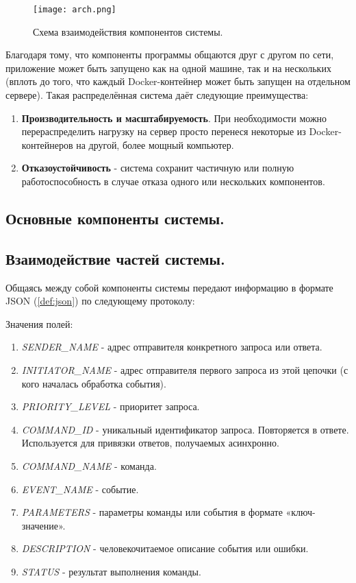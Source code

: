 \begin{figure}[h]
    \centering
    \texttt{[image: arch.png]}
    \caption{Схема взаимодействия компонентов системы.}
    \label{fig:arch}
\end{figure}

\noindent Благодаря тому, что компоненты программы общаются друг с другом по сети, приложение может быть запущено как
на одной машине, так и на нескольких (вплоть до того, что каждый Docker-контейнер может быть запущен на отдельном сервере).
Такая распределённая система даёт следующие преимущества:
\begin{enumerate}
    \item \textbf{Производительность и масштабируемость}. При необходимости можно перераспределить нагрузку на сервер
    просто перенеся некоторые из Docker-контейнеров на другой, более мощный компьютер.
    \item \textbf{Отказоустойчивость} - система сохранит частичную или полную работоспособность в случае отказа одного
    или нескольких компонентов.
\end{enumerate}

\subsection{Основные компоненты системы.}

\subsection{Взаимодействие частей системы.}

Общаясь между собой компоненты системы передают информацию в формате JSON (\ref{def:json}) по следующему протоколу:


Значения полей:
\begin{enumerate}
    \item \textit{SENDER\_NAME} - адрес отправителя конкретного запроса или ответа.
    \item \textit{INITIATOR\_NAME} - адрес отправителя первого запроса из этой цепочки (с кого началась обработка события).
    \item \textit{PRIORITY\_LEVEL} - приоритет запроса.
    \item \textit{COMMAND\_ID} - уникальный идентификатор запроса. Повторяется в ответе.
    Используется для привязки ответов, получаемых асинхронно.
    \item \textit{COMMAND\_NAME} - команда.
    \item \textit{EVENT\_NAME} - событие.
    \item \textit{PARAMETERS} - параметры команды или события в формате «ключ-значение».
    \item \textit{DESCRIPTION} - человекочитаемое описание события или ошибки.
    \item \textit{STATUS} - результат выполнения команды.
\end{enumerate}

